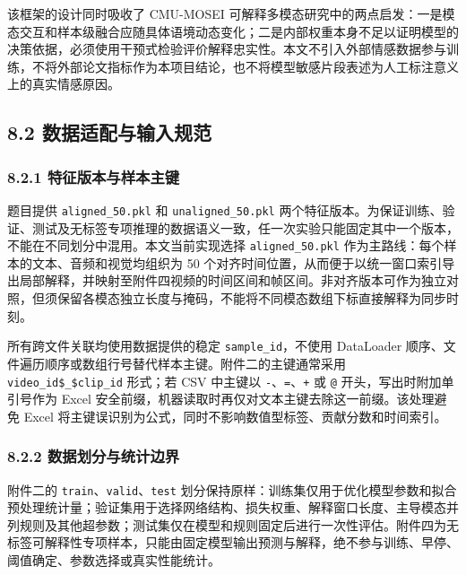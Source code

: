 \documentclass[
  12pt,
  a4paper,
]{ctexart}
\begin{document}
该框架的设计同时吸收了 CMU-MOSEI
可解释多模态研究中的两点启发：一是模态交互和样本级融合应随具体语境动态变化；二是内部权重本身不足以证明模型的决策依据，必须使用干预式检验评价解释忠实性。本文不引入外部情感数据参与训练，不将外部论文指标作为本项目结论，也不将模型敏感片段表述为人工标注意义上的真实情感原因。

\hypertarget{ux6570ux636eux9002ux914dux4e0eux8f93ux5165ux89c4ux8303}{%
\subsection{8.2
数据适配与输入规范}\label{ux6570ux636eux9002ux914dux4e0eux8f93ux5165ux89c4ux8303}}

\hypertarget{ux7279ux5f81ux7248ux672cux4e0eux6837ux672cux4e3bux952e}{%
\subsubsection{8.2.1
特征版本与样本主键}\label{ux7279ux5f81ux7248ux672cux4e0eux6837ux672cux4e3bux952e}}

题目提供 \texttt{aligned\_50.pkl} 和 \texttt{unaligned\_50.pkl}
两个特征版本。为保证训练、验证、测试及无标签专项推理的数据语义一致，任一次实验只能固定其中一个版本，不能在不同划分中混用。本文当前实现选择
\texttt{aligned\_50.pkl} 作为主路线：每个样本的文本、音频和视觉均组织为
50
个对齐时间位置，从而便于以统一窗口索引导出局部解释，并映射至附件四视频的时间区间和帧区间。非对齐版本可作为独立对照，但须保留各模态独立长度与掩码，不能将不同模态数组下标直接解释为同步时刻。

所有跨文件关联均使用数据提供的稳定 \texttt{sample\_id}，不使用
DataLoader
顺序、文件遍历顺序或数组行号替代样本主键。附件二的主键通常采用
\texttt{video\_id\$\_\$clip\_id} 形式；若 CSV 中主键以
\texttt{-}、\texttt{=}、\texttt{+} 或 \texttt{@}
开头，写出时附加单引号作为 Excel
安全前缀，机器读取时再仅对文本主键去除这一前缀。该处理避免 Excel
将主键误识别为公式，同时不影响数值型标签、贡献分数和时间索引。

\hypertarget{ux6570ux636eux5212ux5206ux4e0eux7edfux8ba1ux8fb9ux754c}{%
\subsubsection{8.2.2
数据划分与统计边界}\label{ux6570ux636eux5212ux5206ux4e0eux7edfux8ba1ux8fb9ux754c}}

附件二的 \texttt{train}、\texttt{valid}、\texttt{test}
划分保持原样：训练集仅用于优化模型参数和拟合预处理统计量；验证集用于选择网络结构、损失权重、解释窗口长度、主导模态并列规则及其他超参数；测试集仅在模型和规则固定后进行一次性评估。附件四为无标签可解释性专项样本，只能由固定模型输出预测与解释，绝不参与训练、早停、阈值确定、参数选择或真实性能统计。
\end{document}
